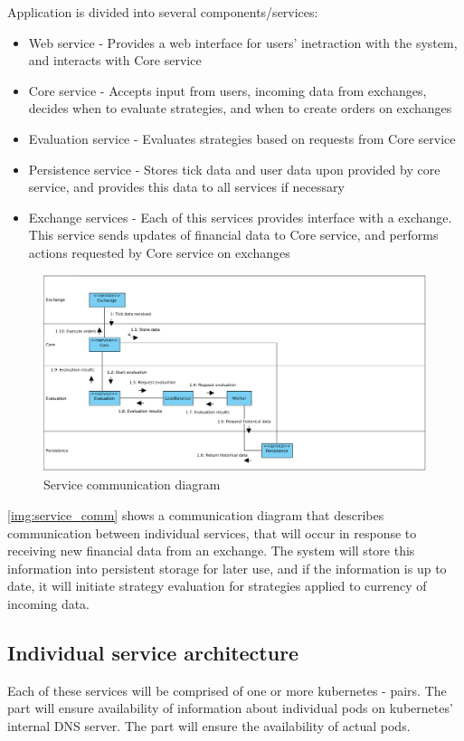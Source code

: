 Application is divided into several components/services:
\begin{itemize}
    \item Web service - Provides a web interface for users' inetraction with the system, and interacts with Core service
    \item Core service - Accepts input from users, incoming data from exchanges, decides when to evaluate strategies, and when to create orders on exchanges
    \item Evaluation service - Evaluates strategies based on requests from Core service
    \item Persistence service - Stores tick data and user data upon provided by core service, and provides this data to all services if necessary
    \item Exchange services - Each of this services provides interface with a exchange. This service sends updates of financial data
    to Core service, and performs actions requested by Core service on exchanges
\end{itemize}

\begin{figure}[H]
    \includegraphics[width=\textwidth]{obrazky-figures/Service communication diagram.png}
    \caption{Service communication diagram}
    \label{img:service_comm}
\end{figure}

\autoref{img:service_comm} shows a communication diagram that describes communication between individual services, that
will occur in response to receiving new financial data from an exchange. The system will store this information
into persistent storage for later use, and if the information is up to date, it will initiate strategy evaluation
for strategies applied to currency of incoming data.

\subsection{Individual service architecture}
Each of these services will be comprised of one or more kubernetes - pairs. The
 part will ensure availability of information about individual pods on kubernetes' internal DNS server.
The  part will ensure the availability of actual pods.

